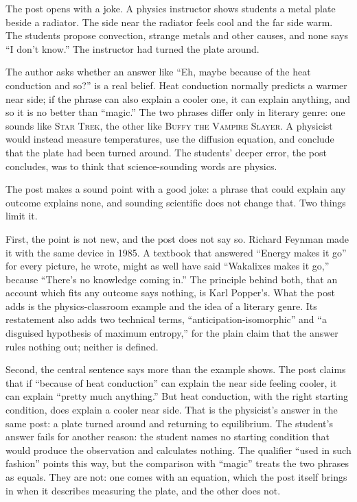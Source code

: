 \begin{afterword}
\summaryhead

The post opens with a joke. A physics instructor shows students a metal plate beside a radiator. The side near the radiator feels cool and the far side warm. The students propose convection, strange metals and other causes, and none says ``I don't know.'' The instructor had turned the plate around.

The author asks whether an answer like ``Eh, maybe because of the heat conduction and so?'' is a real belief. Heat conduction normally predicts a warmer near side; if the phrase can also explain a cooler one, it can explain anything, and so it is no better than ``magic.'' The two phrases differ only in literary genre: one sounds like \textsc{Star Trek}, the other like \textsc{Buffy the Vampire Slayer}. A physicist would instead measure temperatures, use the diffusion equation, and conclude that the plate had been turned around. The students' deeper error, the post concludes, was to think that science-sounding words are physics.

\responsehead

The post makes a sound point with a good joke: a phrase that could explain any outcome explains none, and sounding scientific does not change that. Two things limit it.

First, the point is not new, and the post does not say so. Richard Feynman made it with the same device in 1985. A textbook that answered ``Energy makes it go'' for every picture, he wrote, might as well have said ``Wakalixes makes it go,'' because ``There's no knowledge coming in.'' The principle behind both, that an account which fits any outcome says nothing, is Karl Popper's. What the post adds is the physics-classroom example and the idea of a literary genre. Its restatement also adds two technical terms, ``anticipation-isomorphic'' and ``a disguised hypothesis of maximum entropy,'' for the plain claim that the answer rules nothing out; neither is defined.

Second, the central sentence says more than the example shows. The post claims that if ``because of heat conduction'' can explain the near side feeling cooler, it can explain ``pretty much anything.'' But heat conduction, with the right starting condition, does explain a cooler near side. That is the physicist's answer in the same post: a plate turned around and returning to equilibrium. The student's answer fails for another reason: the student names no starting condition that would produce the observation and calculates nothing. The qualifier ``used in such fashion'' points this way, but the comparison with ``magic'' treats the two phrases as equals. They are not: one comes with an equation, which the post itself brings in when it describes measuring the plate, and the other does not.


\end{afterword}

